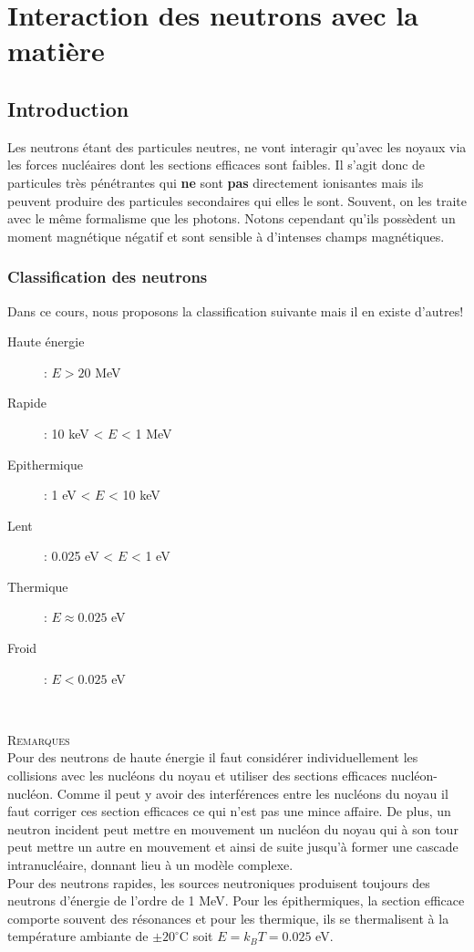 \chapter{Interaction des neutrons avec la matière}
\section{Introduction}
Les neutrons étant des particules neutres, ne vont interagir qu'avec les noyaux via les forces
nucléaires dont les sections efficaces sont faibles. Il s'agit donc de particules très pénétrantes
qui \textbf{ne} sont \textbf{pas} directement ionisantes mais ils peuvent produire des particules
secondaires qui elles le sont. Souvent, on les traite avec le même formalisme que les photons. Notons
cependant qu'ils possèdent un moment magnétique négatif et sont sensible à d'intenses champs
magnétiques.

\subsection{Classification des neutrons}
Dans ce cours, nous proposons la classification suivante mais il en existe d'autres!
\begin{description}
\item[Haute énergie] : $E>20$ MeV
\item[Rapide] : 10 keV < $E$ < 1 MeV
\item[Epithermique] : 1 eV < $E$ < 10 keV
\item[Lent] : 0.025 eV < $E$ < 1 eV
\item[Thermique] : $E\approx 0.025$ eV
\item[Froid] : $E < 0.025$ eV
\end{description}\ 

\textsc{Remarques}\\
Pour des neutrons de haute énergie il faut considérer individuellement les collisions avec les
nucléons du noyau et utiliser des sections efficaces nucléon-nucléon. Comme il peut y avoir des 
interférences entre les nucléons du noyau il faut corriger ces section efficaces ce qui n'est pas
une mince affaire. De plus, un neutron incident peut mettre en mouvement un nucléon du noyau qui
à son tour peut mettre un autre en mouvement et ainsi de suite jusqu'à former une cascade 
intranucléaire, donnant lieu à un modèle complexe.\\

Pour des neutrons rapides, les sources neutroniques produisent toujours des neutrons d'énergie 
de l'ordre de 1 MeV. Pour les épithermiques, la section efficace comporte souvent des résonances 
et pour les thermique, ils se thermalisent à la température ambiante de $\pm20^\circ$C soit
$E=k_BT = 0.025$ eV.

